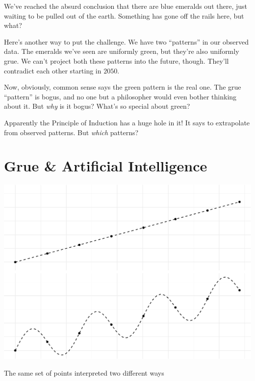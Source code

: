 \documentclass[justified]{tufte-book}
\theoremstyle{definition}
\theoremstyle{definition}
\theoremstyle{definition}
\theoremstyle{definition}
\theoremstyle{remark}
\begin{document}
We've reached the absurd conclusion that there are blue emeralds out there, just waiting to be pulled out of the earth. Something has gone off the rails here, but what?

Here's another way to put the challenge. We have two ``patterns'' in our observed data. The emeralds we've seen are uniformly green, but they're also uniformly grue. We can't project both these patterns into the future, though. They'll contradict each other starting in \(2050\).

Now, obviously, common sense says the green pattern is the real one. The grue ``pattern'' is bogus, and no one but a philosopher would even bother thinking about it. But \emph{why} is it bogus? What's so special about green?

Apparently the Principle of Induction has a huge hole in it! It says to extrapolate from observed patterns. But \emph{which} patterns?

\hypertarget{grue-artificial-intelligence}{%
\section*{Grue \& Artificial Intelligence}\label{grue-artificial-intelligence}}

\begin{marginfigure}
\includegraphics{_main_files/figure-latex/curvefitting-1} \caption[The same set of points interpreted two different ways]{The same set of points interpreted two different ways}\label{fig:curvefitting}
\end{marginfigure}
\end{document}
